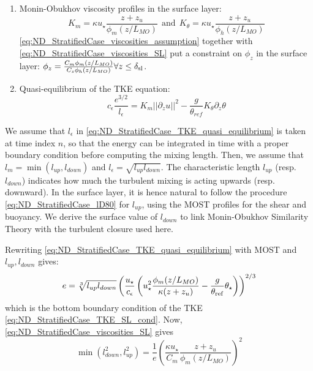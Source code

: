 \begin{enumerate}
\item
Monin-Obukhov viscosity profiles in the surface layer:
\begin{equation}
	\label{eq:ND_StratifiedCase_viscosities_SL}
	K_m = \kappa u_\star\frac{z+ z_{u}}{\phi_m(z/L_{MO})} ~~\text{and}~~
K_\theta = \kappa u_\star\frac{z+ z_{u}}{\phi_h(z/L_{MO})}
\end{equation}
\eqref{eq:ND_StratifiedCase_viscosities_assumption}
together with \eqref{eq:ND_StratifiedCase_viscosities_SL} put
a constraint on $\phi_z$ in the surface layer:
$\phi_z = \frac{C_m\phi_m(z/L_{MO})}{C_s\phi_h(z/L_{MO})}
		\forall z\leq \delta_{\rm sl}$.
\item Quasi-equilibrium of the TKE equation:
\begin{equation}
	\label{eq:ND_StratifiedCase_TKE_quasi_equilibrium}
	c_\epsilon \frac{e^{3/2}}{l_\epsilon}=K_m ||\partial_z u||^2 - \frac{g}{\theta_{ref}} K_\theta \partial_z \theta
\end{equation}
\end{enumerate}
We assume that $l_\epsilon$ in
\eqref{eq:ND_StratifiedCase_TKE_quasi_equilibrium} is taken at
time index $n$, so that the energy can be integrated in time
with a proper boundary condition before computing the mixing
length. Then, we assume that $l_m = \min(l_{up}, l_{down})$ and
$l_\epsilon = \sqrt{l_{up}l_{down}}$.
The characteristic length $l_{up}$ (resp. $l_{down}$) indicates
how much the turbulent mixing is acting upwards (resp. downward).
In the surface layer, it is hence natural to follow the
procedure \eqref{eq:ND_StratifiedCase_lD80} for $l_{up}$,
using the MOST profiles for the shear and buoyancy.
We derive the surface value of $l_{down}$ to link Monin-Obukhov
Similarity Theory with the turbulent closure used here.
\par
Rewriting \eqref{eq:ND_StratifiedCase_TKE_quasi_equilibrium}
with MOST and $l_{up}, l_{down}$ gives:
\begin{equation}
	\label{eq:ND_StratifiedCase_TKE_quasi_equilibrium_simplified}
	e = \sqrt[3]{l_{up} l_{down}}\left(
	\frac{u_\star}{c_\epsilon} 
	\left({u}_\star^2
	\frac{\phi_m(z/L_{MO})}{\kappa (z+z_{u})}
	- \frac{g}{\theta_{\rm ref}}\theta_\star
	\right)
	\right)^{2/3}
\end{equation}
which is the bottom boundary condition of the TKE
\eqref{eq:ND_StratifiedCase_TKE_SL_cond}.
Now, \eqref{eq:ND_StratifiedCase_viscosities_SL} gives
\begin{equation}
	\label{eq:ND_StratifiedCase_solution_l_down1}
	\min (l_{down}^2, l_{up}^2) = \frac{1}{e} \left(
	\frac{\kappa u_\star}{C_m}
	\frac{z + z_{u}}{\phi_m(z/L_{MO})}
\right)^2
\end{equation}
